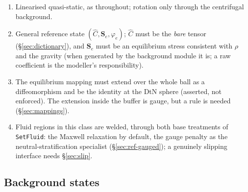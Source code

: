 \documentclass[11pt]{article}
\numberwithin{equation}{section}
\theoremstyle{remark}
\newcommand{\Ch}{\hat{C}}
\newcommand{\Se}{\mathbf{S}_e}
\newcommand{\code}[1]{\texttt{#1}}
\begin{document}
\begin{enumerate}
\item[(R1)] Linearised quasi-static, as throughout; rotation only through
  the centrifugal background.
\item[(R2)] General reference state $(\Ch,\Se,\varphi_e)$; $\Ch$ must be
  the \emph{bare} tensor (\S\ref{sec:dictionary}), and $\Se$ must be an
  equilibrium stress consistent with $\rho$ and the gravity (when generated
  by the background module it is; a raw coefficient is the modeller's
  responsibility).
\item[(R3)] The equilibrium mapping must extend over the whole ball as a
  diffeomorphism and be the identity at the DtN sphere (asserted, not
  enforced). The extension inside the buffer is gauge, but a rule is
  needed (\S\ref{sec:mappings}).
\item[(R4)] Fluid regions in this class are welded, through both base
  treatments of \code{SetFluid}: the Maxwell relaxation by default, the
  gauge penalty as the neutral-stratification specialist
  (\S\ref{sec:ref-gauged}); a genuinely slipping interface needs
  \S\ref{sec:slip}.
\end{enumerate}

\subsection{Background states}
\label{sec:background}
\end{document}
